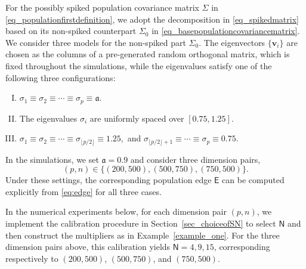\documentclass[12pt]{article}
\def\sN{\mathsf N}
\def\bv{\mathbf{v}}
\theoremstyle{plain}
\numberwithin{equation}{section}
\begin{document}
For the possibly spiked population covariance matrix $\Sigma$ in \eqref{eq_populationfirstdefinition}, we adopt the decomposition in \eqref{eq_spikedmatrix} based on its non-spiked counterpart $\Sigma_0$ in \eqref{eq_basepopulationcovariancematrix}. We consider three models for the non-spiked part $\Sigma_0$. The eigenvectors $\{\bv_i\}$ are chosen as the columns of a pre-generated random orthogonal matrix, which is fixed throughout the simulations, while the eigenvalues satisfy one of the following three configurations:
\begin{enumerate}[(I)]
	\item $\sigma_1 \equiv \sigma_2 \equiv \cdots \equiv \sigma_p \equiv \mathfrak{a}$.
	\item The eigenvalues $\sigma_i$ are uniformly spaced over $[0.75,1.25]$.
	\item $\sigma_1 \equiv \sigma_2 \equiv \cdots \equiv \sigma_{\lfloor p/2 \rfloor} \equiv 1.25,$ and $\sigma_{\lfloor p/2 \rfloor +1} \equiv \cdots \equiv \sigma_p \equiv 0.75.$
\end{enumerate}

In the simulations, we set $\mathfrak{a}=0.9$ and consider three dimension pairs, $$(p,n)\in\{(200,500),(500,750),(750,500)\}. $$ Under these settings, the corresponding population edge $\mathsf E$ can be computed explicitly from \eqref{eq:edge} for all three cases.

In the numerical experiments below, for each dimension pair $(p,n)$, we implement the calibration procedure in Section~\ref{sec_choiceofSN} to select $\sN$ and then construct the multipliers as in Example~\ref{example_one}. For the three dimension pairs above, this calibration yields $\sN=4,9,15$, corresponding respectively to $(200,500)$, $(500,750)$, and $(750,500)$.

%
\end{document}
